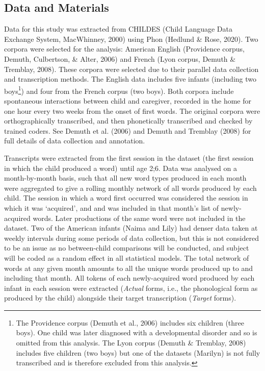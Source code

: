 \documentclass[
  man,mask,floatsintext]{apa6}
\begin{document}
\hypertarget{data-and-materials}{%
\subsection{Data and Materials}\label{data-and-materials}}

Data for this study was extracted from CHILDES (Child Language Data Exchange System, MacWhinney, 2000) using Phon (Hedlund \& Rose, 2020). Two corpora were selected for the analysis: American English (Providence corpus, Demuth, Culbertson, \& Alter, 2006) and French (Lyon corpus, Demuth \& Tremblay, 2008). These corpora were selected due to their parallel data collection and transcription methods. The English data includes five infants (including two boys\footnote{The Providence corpus (Demuth et al., 2006) includes six children (three boys). One child was later diagnosed with a developmental disorder and so is omitted from this analysis. The Lyon corpus (Demuth \& Tremblay, 2008) includes five children (two boys) but one of the datasets (Marilyn) is not fully transcribed and is therefore excluded from this analysis.}) and four from the French corpus (two boys). Both corpora include spontaneous interactions between child and caregiver, recorded in the home for one hour every two weeks from the onset of first words. The original corpora were orthographically transcribed, and then phonetically transcribed and checked by trained coders. See Demuth et al. (2006) and Demuth and Tremblay (2008) for full details of data collection and annotation.

Transcripts were extracted from the first session in the dataset (the first session in which the child produced a word) until age 2;6. Data was analysed on a month-by-month basis, such that all new word types produced in each month were aggregated to give a rolling monthly network of all words produced by each child. The session in which a word first occurred was considered the session in which it was `acquired', and and was included in that month's list of newly-acquired words. Later productions of the same word were not included in the dataset. Two of the American infants (Naima and Lily) had denser data taken at weekly intervals during some periods of data collection, but this is not considered to be an issue as no between-child comparisons will be conducted, and subject will be coded as a random effect in all statistical models. The total network of words at any given month amounts to all the unique words produced up to and including that month. All tokens of each newly-acquired word produced by each infant in each session were extracted (\emph{Actual} forms, i.e., the phonological form as produced by the child) alongside their target transcription (\emph{Target} forms).
\end{document}
